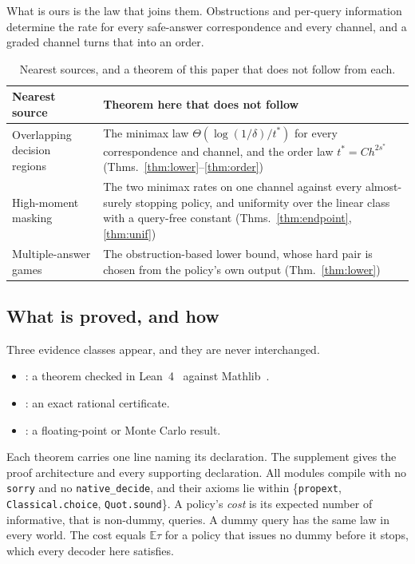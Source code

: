 What is ours is the law that joins them. Obstructions and per-query information determine the
rate for every safe-answer correspondence and every channel, and a graded channel turns that
into an order.

\begin{table}[h]
\caption{Nearest sources, and a theorem of this paper that does not follow from each.}
\label{tab:prior}
\centering
\footnotesize
\begin{tabular}{@{}p{}p{}@{}}
\toprule
Nearest source & Theorem here that does not follow \\
\midrule
Overlapping decision regions~\cite{javdani2014} & The minimax law $\Theta(\log(1/\delta)/t^{*})$
for every correspondence and channel, and the order law $t^{*}=Ch^{2s^{*}}$
(Thms.~\ref{thm:lower}--\ref{thm:order}) \\
High-moment masking~\cite{grosso2014,duc2015} & The two minimax rates on one channel against
every almost-surely stopping policy, and uniformity over the linear class with a
query-free constant (Thms.~\ref{thm:endpoint}, \ref{thm:unif}) \\
Multiple-answer games~\cite{degenne2019,wangyou2026} & The obstruction-based lower bound, whose
hard pair is chosen from the policy's own output (Thm.~\ref{thm:lower}) \\
\bottomrule
\end{tabular}
\end{table}

\subsection{What is proved, and how}

Three evidence classes appear, and they are never interchanged.
\begin{itemize}
\item \PROVED: a theorem checked in Lean~4~\cite{demoura2021} against Mathlib~\cite{mathlib2020}.
\item \CERT: an exact rational certificate.
\item \NUM: a floating-point or Monte Carlo result.
\end{itemize}
Each theorem carries one line naming its declaration. The supplement gives the proof
architecture and every supporting declaration. All modules compile with no \texttt{sorry} and no
\texttt{native\_decide}, and their axioms lie within \{\texttt{propext}, \texttt{Classical.choice},
\texttt{Quot.sound}\}. A policy's \emph{cost} is its expected number of informative, that is
non-dummy, queries. A dummy query has the same law in every world. The cost equals
$\mathbb{E}\tau$ for a policy that issues no dummy before it stops, which every decoder here
satisfies.

